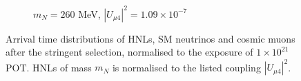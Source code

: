 \begin{figure}[hb!]
\begin{subfigure}[b]{0.495\textwidth}
            \caption{$m_N = 260$ MeV, $|U_{\mu4}|^2 = 1.09 \times 10^{-7}$ }
        \end{subfigure}
        \caption[Stringent Arrival Time Distributions in the Mass Range 180 - 260 MeV]{
	Arrival time distributions of HNLs, SM neutrinos and cosmic muons after the stringent selection, normalised to the exposure of $1 \times 10^{21}$ POT.
	HNLs of mass $m_N$ is normalised to the listed coupling $|U_{\mu4}|^2$.
	}
\end{figure}
